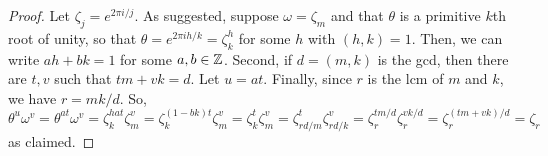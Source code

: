 \begin{proof}
    Let $\zeta_j = e^{2\pi i/j}$. As suggested, suppose $\omega = \zeta_m$ and that $\theta$ is a primitive $k$th root of unity, so that $\theta = e^{2\pi ih/k} = \zeta_k^h$ for some $h$ with $(h,k)=1$. Then, we can write $ah+bk = 1$ for some $a,b \in \mathbb{Z}$. Second, if $d = (m,k)$ is the gcd, then there are $t,v$ such that $tm+vk = d$. Let $u = at$. Finally, since $r$ is the lcm of $m$ and $k$, we have $r = mk/d$. So,
    \[ \theta^u\omega^v = \theta^{at}\omega^v = \zeta_k^{hat}\zeta_m^v = \zeta_k^{(1-bk)t}\zeta_m^v = \zeta_k^t\zeta_m^v = \zeta_{rd/m}^t\zeta_{rd/k}^v = \zeta_r^{tm/d}\zeta_r^{vk/d} = \zeta_r^{(tm+vk)/d} = \zeta_r \]
    as claimed.
\end{proof}
